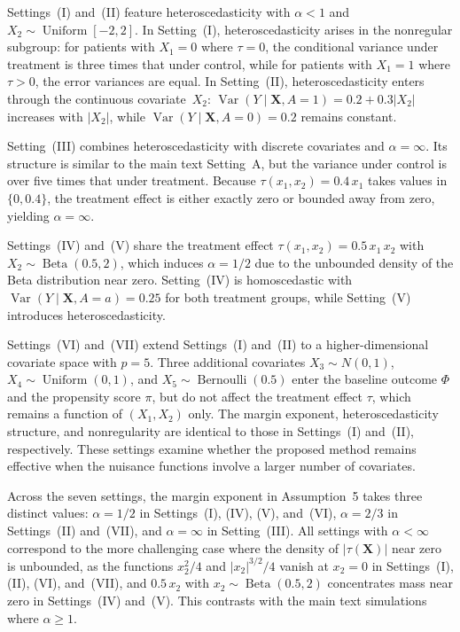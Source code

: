 \documentclass[11pt]{article}
\theoremstyle{referenceplain}
\theoremstyle{referencedefinition}
\theoremstyle{referenceremark}
\begin{document}
Settings~(I) and~(II) feature heteroscedasticity with $\alpha < 1$ and
$X_2 \sim \operatorname{Uniform}[-2,2]$. In Setting~(I),
heteroscedasticity arises in the nonregular subgroup: for patients with
$X_1 = 0$ where $\tau = 0$, the conditional variance under treatment
 is three times that under control, while for patients with $X_1 = 1$ where
$\tau > 0$, the error variances are equal. In Setting~(II),
heteroscedasticity enters through the continuous covariate~$X_2$:
$\operatorname{Var}(Y \mid \mathbf{X}, A=1) = 0.2 + 0.3|X_2|$ increases
with $|X_2|$, while
$\operatorname{Var}(Y \mid \mathbf{X}, A=0) = 0.2$ remains constant.

Setting~(III) combines heteroscedasticity with discrete covariates and
$\alpha = \infty$. Its structure is similar to the main text Setting~A,
but the variance under control is over five
times that under treatment. Because
$\tau(x_1,x_2) = 0.4\,x_1$ takes values in $\{0, 0.4\}$, the treatment
effect is either exactly zero or bounded away from zero, yielding
$\alpha = \infty$.

Settings~(IV) and~(V) share the treatment effect
$\tau(x_1, x_2) = 0.5\,x_1\,x_2$ with
$X_2 \sim \operatorname{Beta}(0.5, 2)$, which induces $\alpha = 1/2$ due
to the unbounded density of the Beta distribution near zero. Setting~(IV)
is homoscedastic with
$\operatorname{Var}(Y \mid \mathbf{X}, A=a) = 0.25$ for both treatment
groups, while Setting~(V) introduces heteroscedasticity.

Settings~(VI) and~(VII) extend Settings~(I) and~(II) to a higher-dimensional covariate space with $p = 5$. Three additional covariates $X_3 \sim N(0,1)$, $X_4 \sim \operatorname{Uniform}(0,1)$, and $X_5 \sim \operatorname{Bernoulli}(0.5)$ enter the baseline outcome $\Phi$ and the propensity score $\pi$, but do not affect the treatment effect $\tau$, which remains a function of $(X_1, X_2)$ only. The margin exponent, heteroscedasticity structure, and nonregularity are identical to those in Settings~(I) and~(II), respectively. These settings examine whether the proposed method remains effective when the nuisance functions involve a larger number of covariates.

Across the seven settings, the margin exponent in Assumption~5 takes three
distinct values: $\alpha = 1/2$ in Settings~(I), (IV), (V), and~(VI),
$\alpha = 2/3$ in Settings~(II) and~(VII), and $\alpha = \infty$ in Setting~(III).
All settings with $\alpha < \infty$ correspond to the more challenging
case where the density of $|\tau(\mathbf{X})|$ near zero is unbounded, as
the functions $x_2^2/4$ and $|x_2|^{3/2}/4$ vanish at $x_2 = 0$ in
Settings~(I), (II), (VI), and~(VII), and $0.5\,x_2$ with
$x_2 \sim \operatorname{Beta}(0.5,2)$ concentrates mass near zero in
Settings~(IV) and~(V). This contrasts with the main text simulations
where $\alpha \geq 1$.
\end{document}
